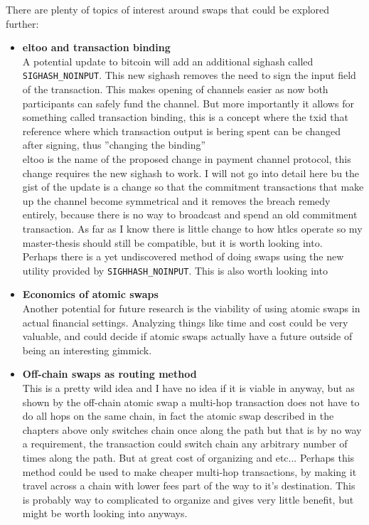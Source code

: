 There are plenty of topics of interest around swaps that could be explored further:
\begin{itemize}
	\item \textbf{eltoo and transaction binding}\\A potential update to bitcoin will add an additional sighash called \texttt{SIGHASH\_NOINPUT}. This new sighash removes the need to sign the input field of the transaction. This makes opening of channels easier as now both participants can safely fund the channel. But more importantly it allows for something called transaction binding, this is a concept where the txid that reference where which transaction output is bering spent can be changed after signing, thus ''changing the binding''\\
	
	eltoo is the name of the proposed change in payment channel protocol, this change requires the new sighash to work. I will not go into detail here bu the gist of the update is a change so that the commitment transactions that make up the channel become symmetrical and it removes the breach remedy entirely, because there is no way to broadcast and spend an old commitment transaction. As far as I know there is little change to how htlcs operate so my master-thesis should still be compatible, but it is worth looking into.\\
	
	Perhaps there is a yet undiscovered method of doing swaps using the new utility provided by \texttt{SIGHHASH\_NOINPUT}. This is also worth looking into\\
	
	\item \textbf{Economics of atomic swaps}\\Another potential for future research is the viability of using atomic swaps in actual financial settings. Analyzing things like time and cost could be very valuable, and could decide if atomic swaps actually have a future outside of being an interesting gimmick.\\
	
	\item \textbf{Off-chain swaps as routing method}\\This is a pretty wild idea and I have no idea if it is viable in anyway, but as shown by the off-chain atomic swap a multi-hop transaction does not have to do all hops on the same chain, in fact the atomic swap described in the chapters above only switches chain once along the path but that is by no way a requirement, the transaction could switch chain any arbitrary number of times along the path. But at great cost of organizing and etc... Perhaps this method could be used to make cheaper multi-hop transactions, by making it travel across a chain with lower fees part of the way to it's destination. This is probably way to complicated to organize and gives very little benefit, but might be worth looking into anyways.\\
	

\end{itemize}
